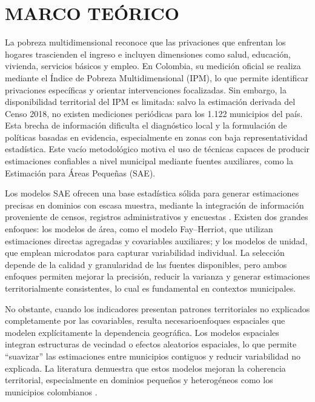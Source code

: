 \section{MARCO TEÓRICO}
La pobreza multidimensional reconoce que las privaciones que enfrentan los hogares trascienden el ingreso e incluyen dimensiones como salud, educación, vivienda, servicios básicos y empleo. En Colombia, su medición oficial se realiza mediante el Índice de Pobreza Multidimensional (IPM), lo que permite identificar privaciones específicas y orientar intervenciones focalizadas. Sin embargo, la disponibilidad territorial del IPM es limitada: salvo la estimación derivada del Censo 2018, no existen mediciones periódicas para los 1.122 municipios del país. Esta brecha de información dificulta el diagnóstico local y la formulación de políticas basadas en evidencia, especialmente en zonas con baja representatividad estadística. Este vacío metodológico motiva el uso de técnicas capaces de producir estimaciones confiables a nivel municipal mediante fuentes auxiliares, como la Estimación para Áreas Pequeñas (SAE).

Los modelos SAE ofrecen una base estadística sólida para generar estimaciones precisas en dominios con escasa muestra, mediante la integración de información proveniente de censos, registros
administrativos y encuestas \cite{CEPAL_PovertyMapping_2022}. Existen dos grandes enfoques: los modelos de área, como el modelo
Fay–Herriot, que utilizan estimaciones directas agregadas y covariables auxiliares; y los modelos de unidad, que emplean microdatos para capturar variabilidad individual. La selección depende de la calidad y granularidad de las fuentes disponibles, pero ambos enfoques permiten mejorar la precisión, reducir la varianza y generar estimaciones territorialmente consistentes, lo cual es fundamental en contextos municipales.

No obstante, cuando los indicadores presentan patrones territoriales no explicados completamente por las covariables, resulta necesarioenfoques espaciales que modelen explícitamente la dependencia geográfica. Los modelos espaciales integran estructuras de vecindad o efectos aleatorios espaciales, lo que permite “suavizar” las estimaciones entre municipios contiguos y reducir variabilidad no explicada. La literatura demuestra que estos modelos mejoran la coherencia territorial, especialmente en dominios pequeños y heterogéneos como los municipios colombianos \cite{PratesiSalvati_2019}.

